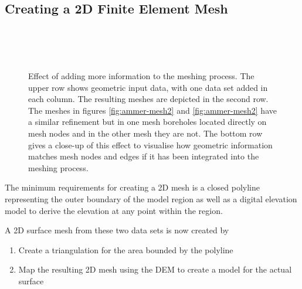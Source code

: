 \subsection{Creating a 2D Finite Element Mesh}
%
\begin{figure}[htb]
\begin{center}
\enspace
{}\enspace
{}\\
\enspace
{}\enspace
{}\\
\enspace
{}\enspace
{}\\
\end{center}
\caption{Effect of adding more information to the meshing process. The upper row shows geometric input data, with one data set added in each column. The resulting meshes are depicted in the second row. The meshes in figures \ref{fig:ammer-mesh2} and \ref{fig:ammer-mesh2} have a similar refinement but in one mesh boreholes located directly on mesh nodes and in the other mesh they are not. The bottom row gives a close-up of this effect to visualise how geometric information matches mesh nodes and edges if it has been integrated into the meshing process.\label{fig:workflow:2Dmesh}}
\end{figure}

The minimum requirements for creating a 2D mesh is a closed polyline representing the outer boundary of the model region as well as a digital elevation model to derive the elevation at any point within the region.

A 2D surface mesh from these two data sets is now created by
\begin{enumerate}
\item Create a triangulation for the area bounded by the polyline \label{step1}
\item Map the resulting 2D mesh using the DEM to create a model for the actual surface \label{step2}
\end{enumerate}

